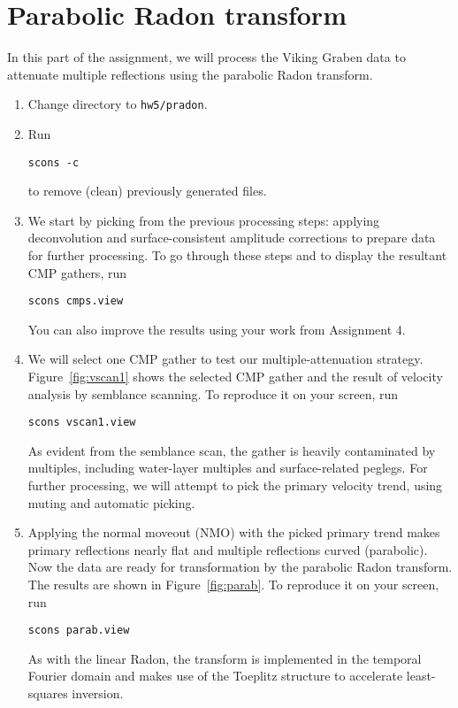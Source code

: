 \section{Parabolic Radon transform}

In this part of the assignment, we will process the Viking Graben data
to attenuate multiple reflections using the parabolic Radon transform.

\begin{enumerate}

\item Change directory to \texttt{hw5/pradon}.
\item Run
\begin{verbatim}
scons -c
\end{verbatim}
to remove (clean) previously generated files.
\item We start by picking from the previous processing steps: applying deconvolution and surface-consistent amplitude corrections to prepare data for further processing. To go through these steps and to display the resultant CMP gathers, run
\begin{verbatim}
scons cmps.view
\end{verbatim}
You can also improve the results using your work from Assignment 4.


\item We will select one CMP gather to test our multiple-attenuation strategy. Figure~\ref{fig:vscan1} shows the selected CMP gather and the result of velocity analysis by semblance scanning. To reproduce it on your screen, run
\begin{verbatim}
scons vscan1.view
\end{verbatim}
As evident from the semblance scan, the gather is heavily contaminated
by multiples, including water-layer multiples and surface-related
peglegs. For further processing, we will attempt to pick the primary
velocity trend, using muting and automatic picking.


\item Applying the normal moveout (NMO) with the picked primary trend makes primary reflections nearly flat and multiple reflections curved (parabolic). Now the data are ready for transformation by the parabolic Radon transform. The results are shown in Figure~\ref{fig:parab}. To reproduce it on your screen, run
\begin{verbatim}
scons parab.view
\end{verbatim}
As with the linear Radon, the transform is implemented in the temporal
Fourier domain and makes use of the Toeplitz structure to accelerate
least-squares inversion.


\end{enumerate}
